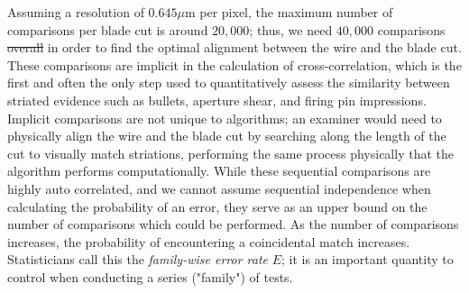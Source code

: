 \documentclass[9pt,twocolumn,twoside]{pnas-new}\usepackage[]{graphicx}\usepackage[dvipsnames]{xcolor}
\providecommand{\DIFadd}[1]{{\protect\color{blue}\uwave{#1}}} %
\providecommand{\DIFdel}[1]{{\protect\color{red}\sout{#1}}}                      %
\providecommand{\DIFaddbegin}{} %
\providecommand{\DIFaddend}{} %
\providecommand{\DIFdelbegin}{} %
\providecommand{\DIFdelend}{} %
\newcommand{\DIFscaledelfig}{0.5}
\newlength{\DIFdelgraphicswidth} %
\newlength{\DIFdelgraphicsheight} %
\newcommand{\DIFaddincludegraphics}[2][]{{\color{blue}\fbox{\DIFOincludegraphics[#1]{#2}}}} %
\newcommand{\DIFdelincludegraphics}[2][]{%
\sbox{\DIFdelgraphicsbox}{\DIFOincludegraphics[#1]{#2}}%
\settoboxwidth{\DIFdelgraphicswidth}{\DIFdelgraphicsbox} %
\settoboxtotalheight{\DIFdelgraphicsheight}{\DIFdelgraphicsbox} %
\scalebox{\DIFscaledelfig}{%
\parbox[b]{\DIFdelgraphicswidth}{\usebox{\DIFdelgraphicsbox}\\[-\baselineskip] \rule{\DIFdelgraphicswidth}{0em}}\llap{\resizebox{\DIFdelgraphicswidth}{\DIFdelgraphicsheight}{%
\setlength{\unitlength}{\DIFdelgraphicswidth}%
\begin{picture}(1,1)%
\thicklines\linethickness{2pt} %
{\color[rgb]{1,0,0}\put(0,0){\framebox(1,1){}}}%
{\color[rgb]{1,0,0}\put(0,0){\line( 1,1){1}}}%
{\color[rgb]{1,0,0}\put(0,1){\line(1,-1){1}}}%
\end{picture}%
}\hspace*{3pt}}} %
} %
\DeclareRobustCommand{\DIFaddbegin}{\DIFOaddbegin \let\includegraphics\DIFaddincludegraphics} %
\DeclareRobustCommand{\DIFaddend}{\DIFOaddend \let\includegraphics\DIFOincludegraphics} %
\DeclareRobustCommand{\DIFdelbegin}{\DIFOdelbegin \let\includegraphics\DIFdelincludegraphics} %
\DeclareRobustCommand{\DIFdelend}{\DIFOaddend \let\includegraphics\DIFOincludegraphics} %
\begin{document}
Assuming a resolution of $0.645 \mu$m per pixel, the maximum number of comparisons per blade cut is around $20,000$; thus, we need $40,000$ comparisons \DIFdelbegin \DIFdel{overall }\DIFdelend in order to find the optimal alignment between the wire and the blade cut.
These comparisons are implicit in the calculation of cross-correlation, which is the first and often the only step used to quantitatively assess the similarity between striated evidence such as bullets, aperture shear, and firing pin impressions.
Implicit comparisons are not unique to algorithms; an examiner would need to physically align the wire and the blade cut by searching along the length of the cut to visually match striations, performing the same process physically that the algorithm performs computationally.
While these sequential comparisons are highly auto correlated, and we cannot assume sequential independence when calculating the probability of an error, they serve as an upper bound on the number of comparisons which could be performed.
As the number of comparisons increases, the probability of encountering a coincidental match increases.
Statisticians call this the \textit{family-wise error rate} $E$; it is an important quantity to control when conducting a series ("family") of tests\DIFaddbegin \DIFadd{\mbox{%
\citep{tukey1953multiple}}\hskip0pt%
}\DIFaddend .
\end{document}
